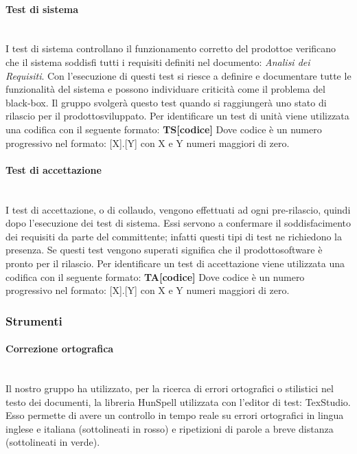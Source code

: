\paragraph*{Test di sistema} \mbox{}\\ [1mm]
I test di sistema controllano il funzionamento corretto del prodotto\glosp e verificano che il sistema soddisfi tutti i requisiti definiti nel documento: \textit{Analisi dei Requisiti}. Con l'esecuzione di questi test si riesce a definire e documentare tutte le funzionalità del sistema e possono individuare criticità come il problema del black-box\glo. Il gruppo svolgerà questo test quando si raggiungerà uno stato di rilascio per il prodotto\glosp sviluppato.
Per identificare un test di unità viene utilizzata una codifica con il seguente formato:
\textbf{TS[codice]}
Dove codice è un numero progressivo nel formato: [X].[Y] con X e Y numeri maggiori di zero.

\paragraph*{Test di accettazione} \mbox{}\\ [1mm]
I test di accettazione, o di collaudo, vengono effettuati ad ogni pre-rilascio, quindi dopo l'esecuzione dei test di sistema. Essi servono a confermare il soddisfacimento dei requisiti da parte del committente; infatti questi tipi di test ne richiedono la presenza. Se questi test vengono superati significa che il prodotto\glosp software è pronto per il rilascio. 
Per identificare un test di accettazione viene utilizzata una codifica con il seguente formato:
\textbf{TA[codice]}
Dove codice è un numero progressivo nel formato: [X].[Y] con X e Y numeri maggiori di zero.

\subsubsection{Strumenti}
	\paragraph{Correzione ortografica}\mbox{}\\ [1mm]
	Il nostro gruppo ha utilizzato, per la ricerca di errori ortografici o stilistici nel testo dei documenti, la libreria HunSpell utilizzata con l'editor di test: TexStudio. Esso permette di avere un controllo in tempo reale su errori ortografici in lingua inglese e italiana (sottolineati in rosso) e ripetizioni di parole a breve distanza (sottolineati in verde).
